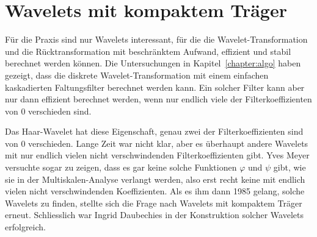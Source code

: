 %
%
%
\chapter{Wavelets mit kompaktem Träger
\label{chapter:kompakt}}
\rhead{}
Für die Praxis sind nur Wavelets interessant, für die die
Wavelet-Transformation und die Rücktransformation mit beschränktem Aufwand,
effizient und stabil berechnet werden können.
Die Untersuchungen in Kapitel~\ref{chapter:algo} haben gezeigt, dass 
die diskrete Wavelet-Transformation mit einem einfachen kaskadierten
Faltungsfilter berechnet werden kann.
Ein solcher Filter kann aber nur dann effizient berechnet werden,
wenn nur endlich viele der Filterkoeffizienten von 0 verschieden sind.

Das Haar-Wavelet hat diese Eigenschaft, genau zwei der Filterkoeffizienten
sind von 0 verschieden.
Lange Zeit war nicht klar, aber es überhaupt andere Wavelets mit
nur endlich vielen nicht verschwindenden Filterkoeffizienten gibt.
Yves Meyer versuchte sogar zu zeigen, dass es gar keine solche Funktionen
$\varphi$ und $\psi$ gibt, wie sie in der Multiskalen-Analyse verlangt
werden, also erst recht keine mit endlich vielen nicht verschwindenden
Koeffizienten.
Als es ihm dann 1985 gelang, solche Wavelets zu finden, stellte sich
die Frage nach Wavelets mit kompaktem Träger erneut.
Schliesslich war Ingrid Daubechies in der Konstruktion solcher Wavelets
erfolgreich.











